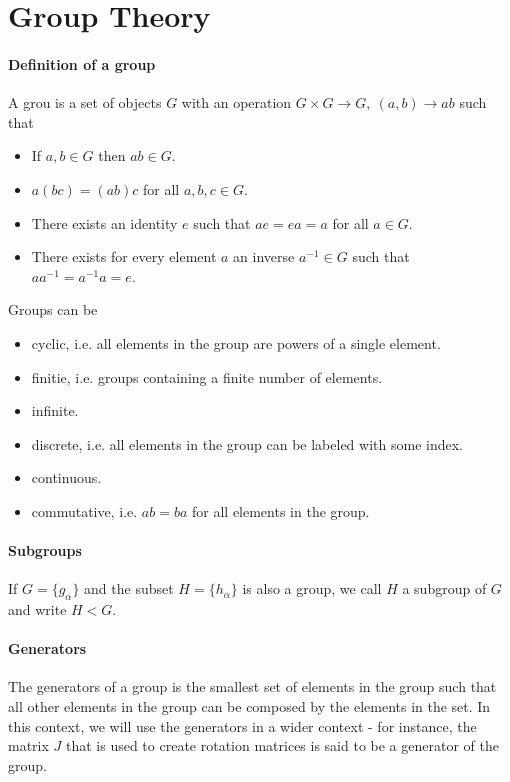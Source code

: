 \section{Group Theory}

\paragraph{Definition of a group}
A grou is a set of objects $G$ with an operation $G\times G\to G,\ (a, b)\to ab$ such that
\begin{itemize}
	\item If $a, b\in G$ then $ab\in G$.
	\item $a(bc) = (ab)c$ for all $a, b, c\in G$.
	\item There exists an identity $e$ such that $ae = ea = a$ for all $a\in G$.
	\item There exists for every element $a$ an inverse $a^{-1}\in G$ such that $aa^{-1} = a^{-1}a = e$.
\end{itemize}
Groups can be
\begin{itemize}
	\item cyclic, i.e. all elements in the group are powers of a single element.
	\item finitie, i.e. groups containing a finite number of elements.
	\item infinite.
	\item discrete, i.e. all elements in the group can be labeled with some index.
	\item continuous.
	\item commutative, i.e. $ab = ba$ for all elements in the group.
\end{itemize}

\paragraph{Subgroups}
If $G = \{g_{\alpha}\}$ and the subset $H = \{h_{\alpha}\}$ is also a group, we call $H$ a subgroup of $G$ and write $H < G$.

\paragraph{Generators}
The generators of a group is the smallest set of elements in the group such that all other elements in the group can be composed by the elements in the set. In this context, we will use the generators in a wider context - for instance, the matrix $J$ that is used to create rotation matrices is said to be a generator of the group.

